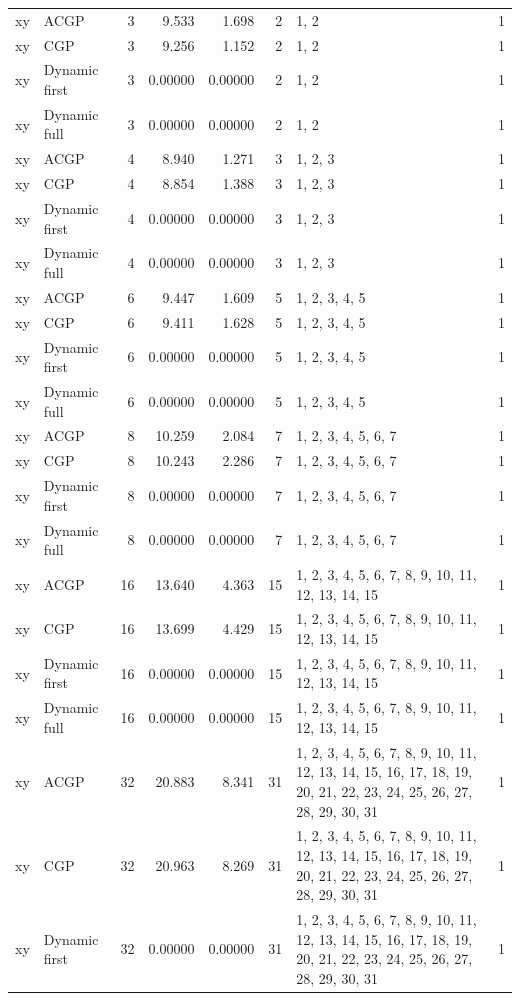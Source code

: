 \documentclass[10pt,a4paper]{article}
\begin{document}
\begin{longtable}{@{}p{23mm}p{29mm}rrrrp{36mm}r@{}}
xy & ACGP & 3 & 9.533 & 1.698 & 2 & 1, 2 & 1 \\
xy & CGP & 3 & 9.256 & 1.152 & 2 & 1, 2 & 1 \\
xy & Dynamic first & 3 & 0.00000 & 0.00000 & 2 & 1, 2 & 1 \\
xy & Dynamic full & 3 & 0.00000 & 0.00000 & 2 & 1, 2 & 1 \\
xy & ACGP & 4 & 8.940 & 1.271 & 3 & 1, 2, 3 & 1 \\
xy & CGP & 4 & 8.854 & 1.388 & 3 & 1, 2, 3 & 1 \\
xy & Dynamic first & 4 & 0.00000 & 0.00000 & 3 & 1, 2, 3 & 1 \\
xy & Dynamic full & 4 & 0.00000 & 0.00000 & 3 & 1, 2, 3 & 1 \\
xy & ACGP & 6 & 9.447 & 1.609 & 5 & 1, 2, 3, 4, 5 & 1 \\
xy & CGP & 6 & 9.411 & 1.628 & 5 & 1, 2, 3, 4, 5 & 1 \\
xy & Dynamic first & 6 & 0.00000 & 0.00000 & 5 & 1, 2, 3, 4, 5 & 1 \\
xy & Dynamic full & 6 & 0.00000 & 0.00000 & 5 & 1, 2, 3, 4, 5 & 1 \\
xy & ACGP & 8 & 10.259 & 2.084 & 7 & 1, 2, 3, 4, 5, 6, 7 & 1 \\
xy & CGP & 8 & 10.243 & 2.286 & 7 & 1, 2, 3, 4, 5, 6, 7 & 1 \\
xy & Dynamic first & 8 & 0.00000 & 0.00000 & 7 & 1, 2, 3, 4, 5, 6, 7 & 1 \\
xy & Dynamic full & 8 & 0.00000 & 0.00000 & 7 & 1, 2, 3, 4, 5, 6, 7 & 1 \\
xy & ACGP & 16 & 13.640 & 4.363 & 15 & 1, 2, 3, 4, 5, 6, 7, 8, 9, 10, 11, 12, 13, 14, 15 & 1 \\
xy & CGP & 16 & 13.699 & 4.429 & 15 & 1, 2, 3, 4, 5, 6, 7, 8, 9, 10, 11, 12, 13, 14, 15 & 1 \\
xy & Dynamic first & 16 & 0.00000 & 0.00000 & 15 & 1, 2, 3, 4, 5, 6, 7, 8, 9, 10, 11, 12, 13, 14, 15 & 1 \\
xy & Dynamic full & 16 & 0.00000 & 0.00000 & 15 & 1, 2, 3, 4, 5, 6, 7, 8, 9, 10, 11, 12, 13, 14, 15 & 1 \\
xy & ACGP & 32 & 20.883 & 8.341 & 31 & 1, 2, 3, 4, 5, 6, 7, 8, 9, 10, 11, 12, 13, 14, 15, 16, 17, 18, 19, 20, 21, 22, 23, 24, 25, 26, 27, 28, 29, 30, 31 & 1 \\
xy & CGP & 32 & 20.963 & 8.269 & 31 & 1, 2, 3, 4, 5, 6, 7, 8, 9, 10, 11, 12, 13, 14, 15, 16, 17, 18, 19, 20, 21, 22, 23, 24, 25, 26, 27, 28, 29, 30, 31 & 1 \\
xy & Dynamic first & 32 & 0.00000 & 0.00000 & 31 & 1, 2, 3, 4, 5, 6, 7, 8, 9, 10, 11, 12, 13, 14, 15, 16, 17, 18, 19, 20, 21, 22, 23, 24, 25, 26, 27, 28, 29, 30, 31 & 1 \\

\end{longtable}
\end{document}
